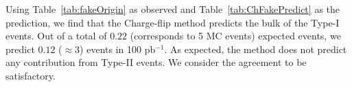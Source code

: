 Using Table~\ref{tab:fakeOrigin} as observed and Table~\ref{tab:ChFakePredict} as the 
prediction, we find that the Charge-flip method predicts the bulk of the Type-I events.
Out of a total of $0.22$ (corresponds to 5 MC events) expected events, we predict 
$0.12$ ($\approx 3$) events in 100 pb$^{-1}$. As expected,
the method does not predict any contribution from Type-II events. 
We consider the agreement to be satisfactory.

